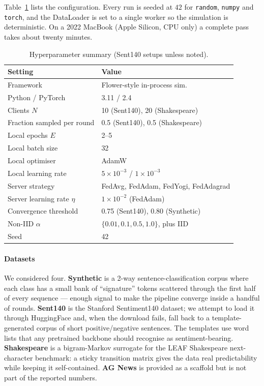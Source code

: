 \documentclass[journal]{IEEEtran}
\begin{document}
Table~\ref{tab:hyper} lists the configuration. Every run is seeded at
$42$ for \texttt{random}, \texttt{numpy} and \texttt{torch}, and the
DataLoader is set to a single worker so the simulation is deterministic.
On a 2022 MacBook (Apple Silicon, CPU only) a complete pass takes about
twenty minutes.

\begin{table}[!t]
\renewcommand{\arraystretch}{1.15}
\caption{Hyperparameter summary (Sent140 setups unless noted).}
\label{tab:hyper}
\centering
\footnotesize
\setlength{\tabcolsep}{3pt}
\begin{tabular}{@{}p{}p{}@{}}
\toprule
Setting & Value\\
\midrule
Framework & Flower-style in-process sim.\\
Python / PyTorch & 3.11 / 2.4\\
Clients $N$ & 10 (Sent140), 20 (Shakespeare)\\
Fraction sampled per round & 0.5 (Sent140), 0.5 (Shakespeare)\\
Local epochs $E$ & 2--5\\
Local batch size & 32\\
Local optimiser & AdamW\\
Local learning rate & $5\!\times\!10^{-3}$ / $1\!\times\!10^{-3}$\\
Server strategy & FedAvg, FedAdam, FedYogi, FedAdagrad\\
Server learning rate $\eta$ & $1\!\times\!10^{-2}$ (FedAdam)\\
Convergence threshold & 0.75 (Sent140), 0.80 (Synthetic)\\
Non-IID $\alpha$ & $\{0.01, 0.1, 0.5, 1.0\}$, plus IID\\
Seed & 42\\
\bottomrule
\end{tabular}
\end{table}

\paragraph{Datasets} We considered four. \textbf{Synthetic} is a 2-way
sentence-classification corpus where each class has a small bank of
``signature'' tokens scattered through the first half of every sequence
--- enough signal to make the pipeline converge inside a handful of rounds.
\textbf{Sent140} is the Stanford Sentiment140 dataset; we attempt to load
it through HuggingFace and, when the download fails, fall back to a
template-generated corpus of short positive/negative sentences. The
templates use word lists that any pretrained backbone should recognise as
sentiment-bearing. \textbf{Shakespeare} is a bigram-Markov surrogate for
the LEAF Shakespeare next-character benchmark: a sticky transition matrix
gives the data real predictability while keeping it self-contained.
\textbf{AG News} is provided as a scaffold but is not part of the
reported numbers.
\end{document}
